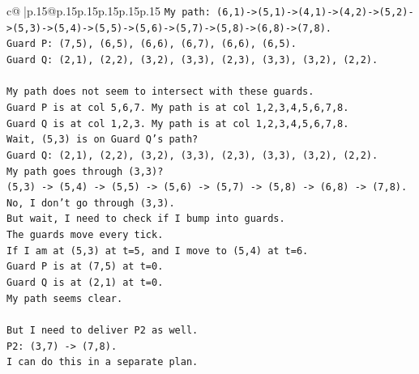 \documentclass{article}
\begin{document}
{\begin{supertabular}{c@{$\;$}|p{.15\linewidth}@{}p{.15\linewidth}p{.15\linewidth}p{.15\linewidth}p{.15\linewidth}p{.15\linewidth}}
{{{\texttt{My path: (6,1){-}>(5,1){-}>(4,1){-}>(4,2){-}>(5,2){-}>(5,3){-}>(5,4){-}>(5,5){-}>(5,6){-}>(5,7){-}>(5,8){-}>(6,8){-}>(7,8).} \\
\texttt{Guard P: (7,5), (6,5), (6,6), (6,7), (6,6), (6,5).} \\
\texttt{Guard Q: (2,1), (2,2), (3,2), (3,3), (2,3), (3,3), (3,2), (2,2).} \\
\\ 
\texttt{My path does not seem to intersect with these guards.} \\
\texttt{Guard P is at col 5,6,7. My path is at col 1,2,3,4,5,6,7,8.} \\
\texttt{Guard Q is at col 1,2,3. My path is at col 1,2,3,4,5,6,7,8.} \\
\texttt{Wait, (5,3) is on Guard Q's path?} \\
\texttt{Guard Q: (2,1), (2,2), (3,2), (3,3), (2,3), (3,3), (3,2), (2,2).} \\
\texttt{My path goes through (3,3)?} \\
\texttt{(5,3) {-}> (5,4) {-}> (5,5) {-}> (5,6) {-}> (5,7) {-}> (5,8) {-}> (6,8) {-}> (7,8).} \\
\texttt{No, I don't go through (3,3).} \\
\texttt{But wait, I need to check if I bump into guards.} \\
\texttt{The guards move every tick.} \\
\texttt{If I am at (5,3) at t=5, and I move to (5,4) at t=6.} \\
\texttt{Guard P is at (7,5) at t=0.} \\
\texttt{Guard Q is at (2,1) at t=0.} \\
\texttt{My path seems clear.} \\
\\ 
\texttt{But I need to deliver P2 as well.} \\
\texttt{P2: (3,7) {-}> (7,8).} \\
\texttt{I can do this in a separate plan.} \\
}}}
\end{supertabular}}
\end{document}
